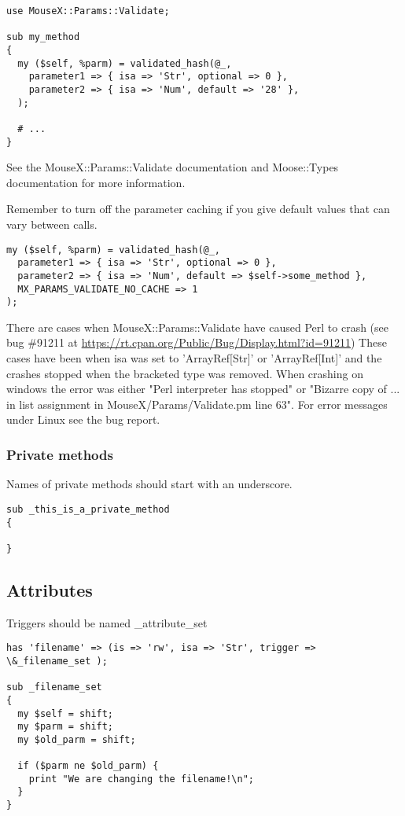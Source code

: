 \begin{verbatim}
use MouseX::Params::Validate;

sub my_method
{
  my ($self, %parm) = validated_hash(@_,
    parameter1 => { isa => 'Str', optional => 0 },
    parameter2 => { isa => 'Num', default => '28' },
  );

  # ...
}
\end{verbatim}

See the MouseX::Params::Validate documentation \cite{params} and Moose::Types documentation \cite{types} for more information.

Remember to turn off the parameter caching if you give default values that can vary between calls.

\begin{verbatim}
my ($self, %parm) = validated_hash(@_,
  parameter1 => { isa => 'Str', optional => 0 },
  parameter2 => { isa => 'Num', default => $self->some_method },
  MX_PARAMS_VALIDATE_NO_CACHE => 1
);
\end{verbatim}

There are cases when MouseX::Params::Validate have caused Perl to crash (see bug \#91211 at \url{https://rt.cpan.org/Public/Bug/Display.html?id=91211})
These cases have been when isa was set to 'ArrayRef[Str]' or 'ArrayRef[Int]' and the crashes stopped when the bracketed type was removed. When crashing on windows the error was either "Perl interpreter has stopped" or "Bizarre copy of ... in list assignment in MouseX/Params/Validate.pm line 63". For error messages under Linux see the bug report.


\subsubsection{Private methods}

Names of private methods should start with an underscore.
\begin{verbatim}
sub _this_is_a_private_method
{

}
\end{verbatim}
\newpage

\subsection{Attributes}
Triggers should be named \_attribute\_set
\begin{verbatim}
has 'filename' => (is => 'rw', isa => 'Str', trigger => \&_filename_set );

sub _filename_set
{
  my $self = shift;
  my $parm = shift;
  my $old_parm = shift;

  if ($parm ne $old_parm) {
    print "We are changing the filename!\n";
  }
}
\end{verbatim}

